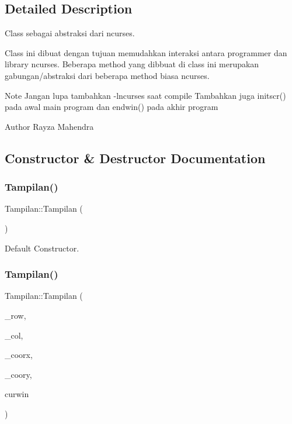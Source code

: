 \subsection{Detailed Description}
Class sebagai abstraksi dari ncurses. 

Class ini dibuat dengan tujuan memudahkan interaksi antara programmer dan library ncurses. Beberapa method yang dibbuat di class ini merupakan gabungan/abstraksi dari beberapa method biasa ncurses.

\begin{DoxyNote}{Note}
Jangan lupa tambahkan -\/lncurses saat compile Tambahkan juga initscr() pada awal main program dan endwin() pada akhir program
\end{DoxyNote}
\begin{DoxyAuthor}{Author}
Rayza Mahendra 
\end{DoxyAuthor}


\subsection{Constructor \& Destructor Documentation}
\mbox{\label{classTampilan_a43f269e3d5c293042af6037f5fdaef05}} 
\subsubsection{\texorpdfstring{Tampilan()}{Tampilan()}\hspace{0.1cm}{\footnotesize\ttfamily [1/2]}}
{\footnotesize\ttfamily Tampilan\+::\+Tampilan (\begin{DoxyParamCaption}{ }\end{DoxyParamCaption})}



Default Constructor. 

\mbox{\label{classTampilan_a287f24563e5ce3776908f4b489a337f3}} 
\subsubsection{\texorpdfstring{Tampilan()}{Tampilan()}\hspace{0.1cm}{\footnotesize\ttfamily [2/2]}}
{\footnotesize\ttfamily Tampilan\+::\+Tampilan (\begin{DoxyParamCaption}\item[{int}]{\+\_\+row,  }\item[{int}]{\+\_\+col,  }\item[{int}]{\+\_\+coorx,  }\item[{int}]{\+\_\+coory,  }\item[{W\+I\+N\+D\+OW $\ast$}]{curwin }\end{DoxyParamCaption})}




